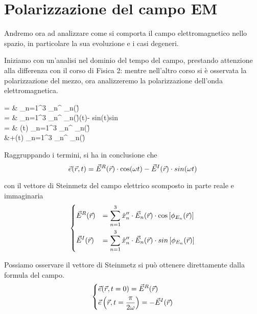 \chapter{Polarizzazione del campo \textsc{EM}}
Andremo ora ad analizzare come si comporta il campo elettromagnetico nello spazio, in particolare la sua evoluzione e i casi degeneri.

Iniziamo con un'analisi nel dominio del tempo del campo, prestando attenzione alla differenza con il corso di Fisica 2: mentre nell'altro corso si è osservata la polarizzazione del mezzo, ora analizzeremo la polarizzazione dell'onda elettromagnetica.
\begin{esp}
	\ert = & \sum\limits_{n=1}^3 _n^{\prime\prime} \cdot \E_n(\r)\cdot \cos{} \\
	= & \sum\limits_{n=1}^3 _n^{\prime\prime} \cdot \E_n(\r)\cdot \cos(\omega t)\cdot \cos{} - sin(\omega t)\cdot sin\\
	= & \cos(\omega t) \cdot \sum\limits_{n=1}^3 _n^{\prime\prime} \cdot \E_n(\r)\cdot \cos {} \\
	&+\sin(\omega t) \cdot \sum\limits_{n=1}^3 _n^{\prime\prime} \cdot \E_n(\r)\cdot \sin {} \\
\end{esp}

Raggruppando i termini, si ha in conclusione che
\begin{equation} \label{eq:ert}
	\vec{e}(\vec{r},t) = \vec{E}^R(\vec{r})\cdot \cos(\omega t) - \vec{E}^I(\vec{r})\cdot sin(\omega t)
\end{equation}

\newpage
con il vettore di Steinmetz del campo elettrico scomposto in parte reale e immaginaria
\begin{equation*} \begin{dcases}
	\vec{E}^R(\vec{r}) &= \sum\limits_{n=1}^3 \hat{x}_n^{\prime\prime} \cdot \vec{E}_n(\vec{r})\cdot \cos \left[ \phi_{E_n}(\vec{r}) \right] \\
	\vec{E}^I(\vec{r}) &= \sum\limits_{n=1}^3 \hat{x}_n^{\prime\prime} \cdot \vec{E}_n(\vec{r})\cdot sin \left[ \phi_{E_n}(\vec{r}) \right]
\end{dcases} \end{equation*}

Possiamo osservare il vettore di Steinmetz si può ottenere direttamente dalla formula del campo.
\begin{equation*} \begin{dcases}
	\vec{e}(\vec{r}, t=0) = \vec{E}^R(\vec{r}) \\
	\vec{e} \left( \vec{r}, t = \frac{\pi}{2\omega} \right) = -\vec{E}^I(\vec{r})
\end{dcases} \end{equation*}

